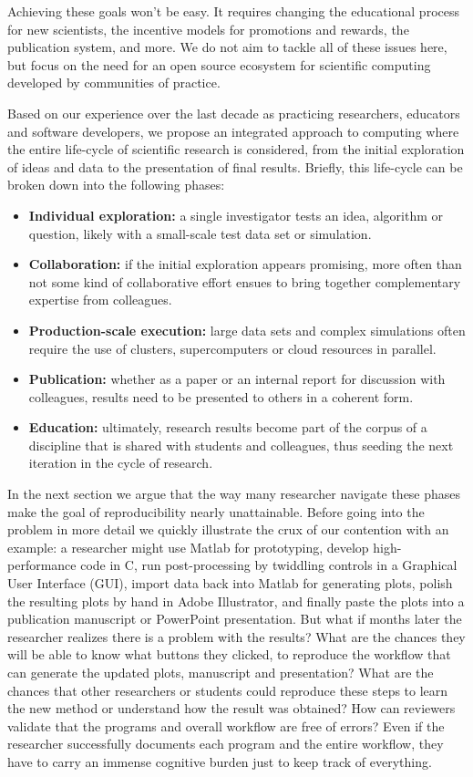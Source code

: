 \documentclass[ChapterTOCs,krantz2]{krantz} %
\begin{document}
Achieving these goals won't be easy.  It requires changing the educational
process for new scientists, the incentive models for promotions and rewards,
the publication system, and more. We do not aim to tackle all of these issues
here, but focus on the need for an open source ecosystem for scientific
computing developed by communities of practice.

Based on our experience over the last decade as practicing researchers,
educators and software developers, we propose an integrated approach to
computing where the entire life-cycle of scientific research is considered,
from the initial exploration of ideas and data to the presentation of final
results.  Briefly, this life-cycle can be broken down into the following
phases:

\begin{itemize}
\item \textbf{Individual exploration:} a single investigator tests an idea,
  algorithm or question, likely with a small-scale test data set or simulation.
\item \textbf{Collaboration:} if the initial exploration appears promising,
  more often than not some kind of collaborative effort ensues to bring
  together complementary expertise from colleagues.
\item \textbf{Production-scale execution:} large data sets and complex
  simulations often require the use of clusters, supercomputers or cloud
  resources in parallel.
\item \textbf{Publication:} whether as a paper or an internal report for
  discussion with colleagues, results need to be presented to others in a
  coherent form.
\item \textbf{Education:} ultimately, research results become part of the
  corpus of a discipline that is shared with students and colleagues, thus
  seeding the next iteration in the cycle of research.
\end{itemize}

In the next section we argue that the way many researcher navigate these phases
make the goal of reproducibility nearly unattainable. Before going into the
problem in more detail we quickly illustrate the crux of our contention with an
example: a researcher might use Matlab for prototyping, develop
high-performance code in C, run post-processing by twiddling controls in a
Graphical User Interface (GUI), import data back into Matlab for generating
plots, polish the resulting plots by hand in Adobe Illustrator, and finally
paste the plots into a publication manuscript or PowerPoint presentation. But
what if months later the researcher realizes there is a problem with the
results? What are the chances they will be able to know what buttons they
clicked, to reproduce the workflow that can generate the updated plots,
manuscript and presentation? What are the chances that other researchers or
students could reproduce these steps to learn the new method or understand how
the result was obtained? How can reviewers validate that the programs and
overall workflow are free of errors? Even if the researcher successfully
documents each program and the entire workflow, they have to carry an immense
cognitive burden just to keep track of everything.
\end{document}
